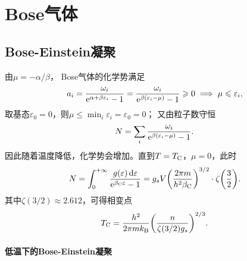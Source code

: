 \section{Bose气体}

\subsection{Bose-Einstein凝聚}

由$\mu=-\alpha/\beta$，
Bose气体的化学势满足
\[
	a_i=\frac{\omega_i}{\mathop{}\!\mathrm{e}^{\alpha+\beta\varepsilon_i}-1}=\frac{\omega_i}{\mathop{}\!\mathrm{e}^{\beta(\varepsilon_i-\mu)}-1}\geqslant 0
	\implies\mu\leqslant\varepsilon_i,
\]
取基态$\varepsilon_0=0$，则$\mu\leq\min_i\varepsilon_i=\varepsilon_0=0$；
又由粒子数守恒
\[
	N=\sum_i\frac{\omega_i}{\mathop{}\!\mathrm{e}^{\beta(\varepsilon_i-\mu)}-1}.
\]
因此随着温度降低，化学势会增加。直到$T=T_{\mathrm{C}}$，$\mu=0$，此时
\[
	N=\int_0^{+\infty}\frac{g(\varepsilon)\mathop{}\!\mathrm{d}\varepsilon}{\mathop{}\!\mathrm{e}^{\beta_{\mathrm{C}}\varepsilon}-1}
	=g_sV\biggl(\frac{2\pi m}{h^2\beta_{\mathrm{C}}}\biggr)^{3/2}\cdot\zeta\biggl(\frac32\biggr).
\]
其中$\zeta(3/2)\approx 2.612$，可得相变点
\begin{equation}
	\label{eq:Bose TC}
	T_{\mathrm{C}}=\frac{h^2}{2\pi mk_{\mathrm B}}\biggl(\frac n{\zeta(3/2)g_s}\biggr)^{2/3}.
\end{equation}

\paragraph{低温下的Bose-Einstein凝聚}

